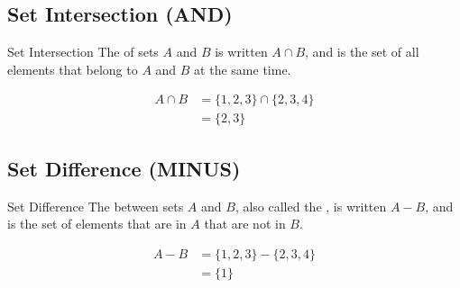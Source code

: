\documentclass[../notes.tex]{subfiles}
\begin{document}
			\subsection[Set Intersection]{Set Intersection (AND)}
				\begin{definition}{Set Intersection}
					The  of sets $A$ and $B$ is written $A \cap  B$, and is the set of all elements that belong to $A$ and $B$ at the same time.
				\end{definition}
				\nopagebreak
				\begin{center}
					\begin{venntwo}[][$A \cap B = \bigl\{x \mid x \in A$ and $x \in B\bigr\}$]
						\fillACapB
					\end{venntwo}
				\end{center}
				\nopagebreak
				\begin{example} \moveup
					\begin{align*}
						A \cap B &= \{1, 2, 3\} \cap \{2, 3, 4\}\\
						&= \{2, 3\}
					\end{align*}
				\end{example}

			\subsection[Set Difference]{Set Difference (MINUS)}
				\begin{definition}{Set Difference}
					The  between sets $A$ and $B$, also called the , is written $A - B$, and is the set of elements that are in $A$ that are not in $B$.
				\end{definition}
				\nopagebreak
				\begin{center}
					\begin{venntwo}[][$A - B = \bigl\{x \mid x \in A$ and $x \notin B\bigr\}$]
						\fillOnlyA
					\end{venntwo}
				\end{center}
				\nopagebreak
				\begin{example} \moveup
					\begin{align*}
						A - B &= \{1, 2, 3\} - \{2, 3, 4\}\\
						&= \{1\}
					\end{align*}
				\end{example}
\end{document}
